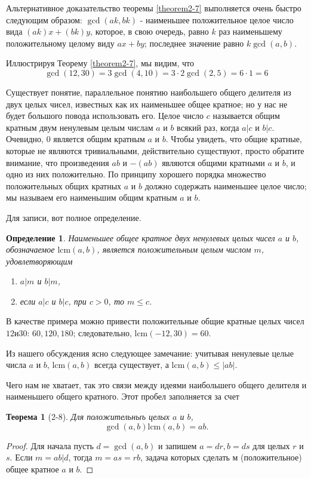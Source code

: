 \documentclass[11pt]{article}
\newtheorem{theorem}{Теорема}
\newtheorem{definition}{Определение}
\begin{document}
Альтернативное доказательство теоремы \ref{theorem2-7} выполняется очень быстро следующим образом: $\gcd (ak, bk)$ - наименьшее положительное целое число вида $(ak)x + (bk)y$, которое, в свою очередь, равно $k$ раз наименьшему положительному целому виду $ax + by$; последнее значение равно $k \gcd (a, b)$.

Иллюстрируя Теорему \ref{theorem2-7}, мы видим, что
\[\gcd(12, 30) = 3\gcd(4, 10) = 3 \cdot 2 \gcd(2, 5) = 6 \cdot 1 = 6\]

Существует понятие, параллельное понятию наибольшего общего делителя
из двух целых чисел, известных как их наименьшее общее кратное; но у нас не будет большого повода использовать его. Целое число $c$ называется общим кратным двум ненулевым целым числам $a$ и $b$ всякий раз, когда $a|c$ и $b|c$. Очевидно, $0$ является общим кратным $a$ и $b$. Чтобы увидеть, что общие кратные, которые не являются тривиальными, действительно существуют, просто обратите внимание, что произведения $ab$ и $-(ab)$ являются общими кратными $a$ и $b$, и одно из них положительно. По принципу хорошего порядка множество положительных общих кратных $a$ и $b$ должно содержать наименьшее целое число; мы называем его наименьшим общим кратным $a$ и $b$.

Для записи, вот полное определение.

\begin{definition}
	Наименьшее общее кратное двух ненулевых целых чисел $a$ и $b$, обозначаемое $\mathrm{lcm}(a, b)$, является положительным целым числом $m$, удовлетворяющим
	\begin{enumerate}
		\item $a|m$ и $b|m$,
		\item если $a|c$ и $b|c$, при $c > 0$, то $m \leq c$.
	\end{enumerate}
\end{definition}

В качестве примера можно привести положительные общие кратные целых чисел
$12 и 30$: $60, 120, 180$; следовательно, $\mathrm{lcm}(-12, 30) = 60$.

Из нашего обсуждения ясно следующее замечание: учитывая ненулевые целые числа $a$ и $b$, $\mathrm{lcm}(a, b)$ всегда существует, а $\mathrm{lcm}(a, b) \leq |ab|$.

Чего нам не хватает, так это связи между идеями наибольшего общего делителя и наименьшего общего кратного. Этот пробел заполняется за счет

\begin{theorem}[2-8]
	Для положительныъ целых $a$ и $b$,
	\[\gcd(a, b)\mathrm{lcm}(a, b) = ab.\]
\end{theorem}

\begin{proof}
	Для начала пусть $d = \gcd(a, b)$ и запишем $a = dr, b = ds$ для целых $r$ и $s$. Если $m = ab|d$, тогда $m = as = rb$, задача которых сделать $м$ (положительное) общее кратное $a$ и $b$.
\end{proof}
\end{document}
